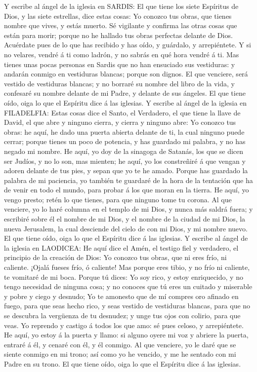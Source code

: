  Y escribe al ángel de la iglesia en SARDIS: El que tiene
los siete Espíritus de Dios, y las siete estrellas, dice estas cosas: Yo
conozco tus obras, que tienes nombre que vives, y estás muerto.
 Sé vigilante y confirma las otras cosas que están para
morir; porque no he hallado tus obras perfectas delante de Dios.
 Acuérdate pues de lo que has recibido y has oído, y
guárdalo, y arrepiéntete. Y si no velares, vendré á ti como ladrón, y no
sabrás en qué hora vendré á ti.  Mas tienes unas pocas
personas en Sardis que no han ensuciado sus vestiduras: y andarán
conmigo en vestiduras blancas; porque son dignos.  El que
venciere, será vestido de vestiduras blancas; y no borraré su nombre del
libro de la vida, y confesaré su nombre delante de mi Padre, y delante
de sus ángeles.  El que tiene oído, oiga lo que el Espíritu
dice á las iglesias.  Y escribe al ángel de la iglesia en
FILADELFIA: Estas cosas dice el Santo, el Verdadero, el que tiene la
llave de David, el que abre y ninguno cierra, y cierra y ninguno abre:
 Yo conozco tus obras: he aquí, he dado una puerta abierta
delante de ti, la cual ninguno puede cerrar; porque tienes un poco de
potencia, y has guardado mi palabra, y no has negado mi nombre.
 He aquí, yo doy de la sinagoga de Satanás, los que se dicen
ser Judíos, y no lo son, mas mienten; he aquí, yo los constreñiré á que
vengan y adoren delante de tus pies, y sepan que yo te he amado.
 Porque has guardado la palabra de mi paciencia, yo también
te guardaré de la hora de la tentación que ha de venir en todo el mundo,
para probar á los que moran en la tierra.  He aquí, yo
vengo presto; retén lo que tienes, para que ninguno tome tu corona.
 Al que venciere, yo lo haré columna en el templo de mi
Dios, y nunca más saldrá fuera; y escribiré sobre él el nombre de mi
Dios, y el nombre de la ciudad de mi Dios, la nueva Jerusalem, la cual
desciende del cielo de con mi Dios, y mi nombre nuevo.  El
que tiene oído, oiga lo que el Espíritu dice á las iglesias.
 Y escribe al ángel de la iglesia en LAODICEA: He aquí dice
el Amén, el testigo fiel y verdadero, el principio de la creación de
Dios:  Yo conozco tus obras, que ni eres frío, ni caliente.
¡Ojalá fueses frío, ó caliente!  Mas porque eres tibio, y
no frío ni caliente, te vomitaré de mi boca.  Porque tú
dices: Yo soy rico, y estoy enriquecido, y no tengo necesidad de ninguna
cosa; y no conoces que tú eres un cuitado y miserable y pobre y ciego y
desnudo;  Yo te amonesto que de mí compres oro afinado en
fuego, para que seas hecho rico, y seas vestido de vestiduras blancas,
para que no se descubra la vergüenza de tu desnudez; y unge tus ojos con
colirio, para que veas.  Yo reprendo y castigo á todos los
que amo: sé pues celoso, y arrepiéntete.  He aquí, yo estoy
á la puerta y llamo: si alguno oyere mi voz y abriere la puerta, entraré
á él, y cenaré con él, y él conmigo.  Al que venciere, yo
le daré que se siente conmigo en mi trono; así como yo he vencido, y me
he sentado con mi Padre en su trono.  El que tiene oído,
oiga lo que el Espíritu dice á las iglesias.

